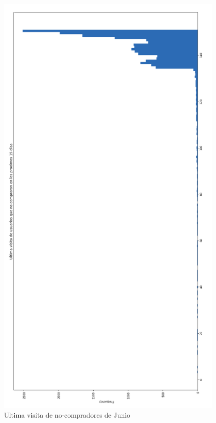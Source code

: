 \documentclass[a4paper ,12pt]{article}
\begin{document}
\begin{figure}[H]
\centering
\includegraphics[width=\linewidth ,  height=0.95\textheight]{ult_vis_prev_no_compra}
\caption{Ultima visita de no-compradores de Junio}
\label{fig:ult_vis_prev_no_compra}
\end{figure}
\end{document}
